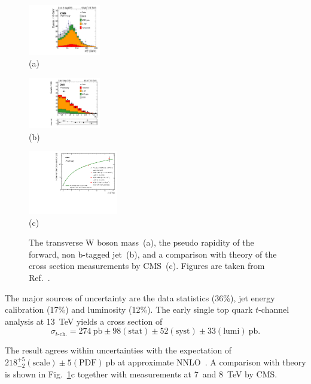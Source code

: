 \documentclass{PoS}
\begin{document}
\begin{figure}[htbp]
\begin{center}
\parbox[t]{0.29\textwidth}{\centering\includegraphics[width=0.28\textwidth]{cms_xsec13/mtw.pdf}\\(a)}
\parbox[t]{0.29\textwidth}{\centering\includegraphics[width=0.28\textwidth]{cms_xsec13/mu2j1t.pdf}\\(b)}
\parbox[t]{0.39\textwidth}{\centering\includegraphics[width=0.35\textwidth]{cms_xsec13/xsec.pdf}\\(c)}
\end{center}
\caption{\label{fig:singletop13}The transverse W boson mass~(a), the pseudo rapidity of the forward, non b-tagged jet~(b), and a comparison with theory of the cross section measurements by CMS~(c). Figures are taken from Ref.~\cite{CMS-PAS-TOP-15-004}.}
\end{figure}

The major sources of uncertainty are the data statistics (36\%), jet energy calibration (17\%) and luminosity (12\%).
The early single top quark $t$-channel analysis at 13~TeV yields a cross section of
\begin{equation}
\sigma_{t\mbox{-}\mathrm{ch.}}=274~\mathrm{pb}\pm98\mathrm{(stat)}\pm52\mathrm{(syst)}\pm33\mathrm{(lumi)}~\mathrm{pb}.
\end{equation}

The result agrees within uncertainties with the expectation of $218_{-2}^{+5}\mathrm{(scale)}\pm5\mathrm{(PDF)}~\mathrm{pb}$ at approximate NNLO~\cite{Kidonakis-8tev}. A comparison with theory is shown in Fig.~\ref{fig:singletop13}c together with measurements at 7~and 8~TeV by CMS.
\end{document}
